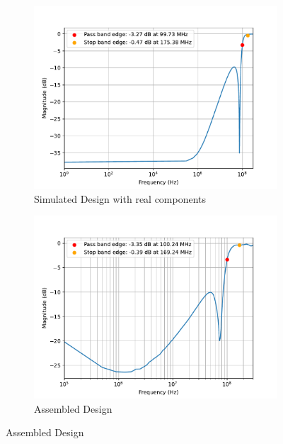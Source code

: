\documentclass[letterpaper,12pt]{article}
\begin{document}
\begin{figure}[H]
    \begin{subfigure}[t]{.49\textwidth}
      \centering
      \includegraphics[width=\linewidth]{figures/7.real}
      \caption{Simulated Design with real components}
    \end{subfigure}
    \hfill
    \begin{subfigure}[t]{.49\textwidth}
      \centering
      \includegraphics[width=\linewidth]{figures/7.assembled}
      \caption{Assembled Design}
    \end{subfigure}
  \end{figure}

\newpage
\end{document}
